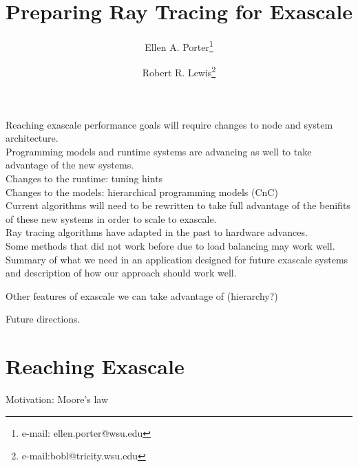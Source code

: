 \documentclass{vgtc}                          %
\title{Preparing Ray Tracing for Exascale}
\author{Ellen A. Porter\thanks{e-mail: ellen.porter@wsu.edu} %
\and Robert R. Lewis\thanks{e-mail:bobl@tricity.wsu.edu}}
\affiliation{\scriptsize Washington State University, Tri-Cities \\ Computer Science}
\begin{document}


\maketitle


Reaching exascale performance goals will require changes to node 
and system architecture. \\

Programming models and runtime systems are advancing as well to 
take advantage of the new systems. \\

Changes to the runtime: tuning hints \\
Changes to the models:  hierarchical programming models (CnC) \\

Current algorithms will need to be rewritten to take full advantage 
of the benifits of these new systems in order to scale to exascale. \\

Ray tracing algorithms have adapted in the past to hardware advances. \\

Some methods that did not work before due to load balancing may work well. \\

Summary of what we need in an application designed for future exascale systems 
and description of how our approach should work well.

Other features of exascale we can take advantage of (hierarchy?)

Future directions. \\

\section{Reaching Exascale}
Motivation: Moore's law
\end{document}
